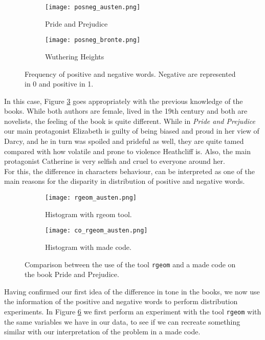 \documentclass{article}
\begin{document}
\begin{figure}[]
\begin{subfigure}{.5\textwidth}
  \centering
  \texttt{[image: posneg\_austen.png]}  
  \caption{Pride and Prejudice}
  \label{subfig3-1}
\end{subfigure}
\begin{subfigure}{.5\textwidth}
  \centering
  \texttt{[image: posneg\_bronte.png]}  
  \caption{Wuthering Heights}
  \label{subfig3-2}
\end{subfigure}
\caption{Frequency of positive and negative words. Negative are represented in 0 and positive in 1.}
\label{fig3}
\end{figure}

In this case, Figure \ref{fig3} goes appropriately with the previous knowledge of the books. While both authors are female, lived in the 19th century and both are novelists, the feeling of the book is quite different. While in \textit{Pride and Prejudice} our main protagonist Elizabeth is guilty of being biased and proud in her view of Darcy, and he in turn was spoiled and prideful as well, they are quite tamed compared with how volatile and prone to violence Heathcliff is. Also, the main protagonist Catherine is very selfish and cruel to everyone around her. \\

For this, the difference in characters behaviour, can be interpreted as one of the main reasons for the disparity in distribution of positive and negative words.\\
 

\begin{figure}[]
\begin{subfigure}{.5\textwidth}
  \centering
  \texttt{[image: rgeom\_austen.png]}  
  \caption{Histogram with rgeom tool.}
  \label{subfig4-1}
\end{subfigure}
\begin{subfigure}{.5\textwidth}
  \centering
  \texttt{[image: co\_rgeom\_austen.png]}  
  \caption{Histogram with made code.}
  \label{subfig4-2}
\end{subfigure}
\caption{Comparison between the use of the tool \texttt{rgeom} and a made code on the book Pride and Prejudice.}
\label{fig4}
\end{figure}

Having confirmed our first idea of the difference in tone in the books, we now use the information of the positive and negative words to perform distribution experiments. In Figure \ref{fig4} we first perform an experiment with the tool \texttt{rgeom} \cite{rgeom} with the same variables we have in our data, to see if we can recreate something similar with our interpretation of the problem in a made code. \\
\end{document}
